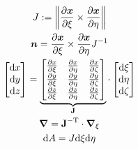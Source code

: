 \documentclass[a4paper,11pt]{article}
\renewcommand{\to}[1]{\text{\boldmath $#1$}} %
\newcommand{\ts}[1]{\text{\boldmath $\mathrm{#1}$}} %
\newcommand{\intd}[1]{\mathrm{d}#1}
\newcommand{\pderiv}[2]{\frac{\partial#1}{\partial#2}}
\newcommand{\norm}[1]{\left\lVert{#1}\right\rVert}
\newcommand{\T}{\mathrm{T}}
\newcommand{\defeq}{:=}
\begin{document}
\begin{gather}
 J \defeq \norm{\pderiv{\to x}{\xi} \times  \pderiv{\to x}{\eta}}\\
 \to n = \pderiv{\to x}{\xi} \times \pderiv{\to x}{\eta} J^{-1}\\
 \begin{bmatrix}\intd x\\ \intd y\\ \intd z\end{bmatrix} =
  \underbrace{\begin{bmatrix}\pderiv{x}{\xi} & \pderiv{x}{\eta} & \pderiv{x}{\zeta}\\
	  \pderiv{y}{\xi} & \pderiv{y}{\eta} & \pderiv{y}{\zeta}\\
	  \pderiv{z}{\xi} & \pderiv{z}{\eta} & \pderiv{z}{\zeta} \end{bmatrix}}_{\ts J}
  \cdot \begin{bmatrix}\intd \xi \\ \intd \eta \\ \intd \zeta\end{bmatrix}\\
 \to\nabla = \ts J^{-\T}\cdot\to\nabla_\xi\\
 \intd A = J \intd \xi \intd \eta 
\end{gather}


\end{document}
